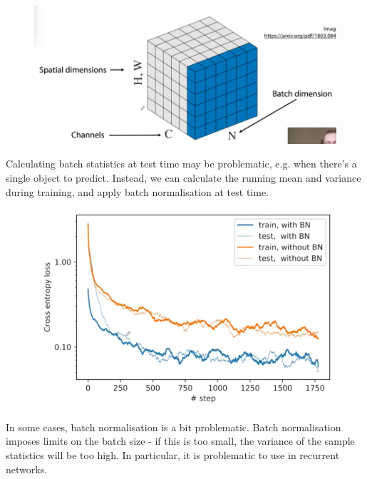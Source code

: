  \begin{figure}[H]
 \centering
 \includegraphics[scale=0.4]{dimensionnormalisation.png}
 \end{figure}
 
 




\newpage
 Calculating batch statistics at test time may be problematic, e.g. when there's a single object to predict. Instead, we can calculate the running mean and variance during training, and apply batch normalisation at test time. 
 
 \begin{figure}[H]
 \centering
 \includegraphics[scale=0.4]{batchnormalisation.png}
 \end{figure}
 
 In some cases, batch normalisation is a bit problematic. Batch normalisation imposes limits on the batch size - if this is too small, the variance of the sample statistics will be too high. In particular, it is problematic to use in recurrent networks.\\
 
